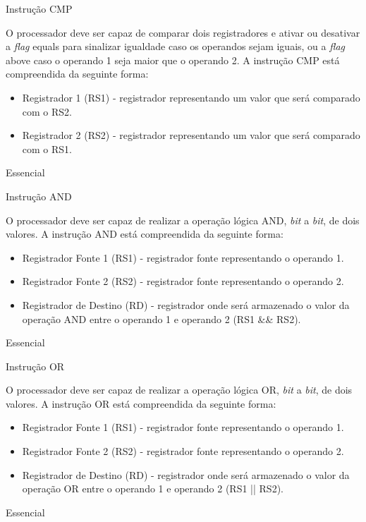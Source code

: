 \documentclass{article}
\begin{document}
\begin{functional}
     \requirement
      {Instrução CMP}
      {O processador deve ser capaz de comparar dois registradores e ativar ou desativar a \textit{flag} equals para sinalizar igualdade caso os operandos sejam iguais, ou a \textit{flag} above caso o operando 1 seja maior que o operando 2.
      A instrução CMP está compreendida da seguinte forma:\\
      \begin{itemize}
       \item Registrador 1 (RS1) - registrador representando um valor que será comparado com o RS2.
       \item Registrador 2 (RS2) - registrador representando um valor que será comparado com o RS1.
      \end{itemize}
      }
      {Essencial}

      \requirement
      {Instrução AND}
      {O processador deve ser capaz de realizar a operação lógica AND, \textit{bit} a \textit{bit}, de dois valores.
      A instrução AND está compreendida da seguinte forma:\\
       \begin{itemize}
        \item Registrador Fonte 1 (RS1) - registrador fonte representando o operando 1.
        \item Registrador Fonte 2 (RS2) - registrador fonte representando o operando 2.
        \item Registrador de Destino (RD) - registrador onde será armazenado o valor da operação AND entre o operando 1 e operando 2 (RS1 \&\& RS2).
       \end{itemize}
       }
      {Essencial}

      \requirement
      {Instrução OR}
      {O processador deve ser capaz de realizar a operação lógica OR, \textit{bit} a \textit{bit}, de dois valores.
      A instrução OR está compreendida da seguinte forma:\\
       \begin{itemize}
        \item Registrador Fonte 1 (RS1) - registrador fonte representando o operando 1.
        \item Registrador Fonte 2 (RS2) - registrador fonte representando o operando 2.
        \item Registrador de Destino (RD) - registrador onde será armazenado o valor da operação OR entre o operando 1 e operando 2 (RS1 || RS2).
       \end{itemize}
       }
      {Essencial}


\end{functional}
\end{document}

